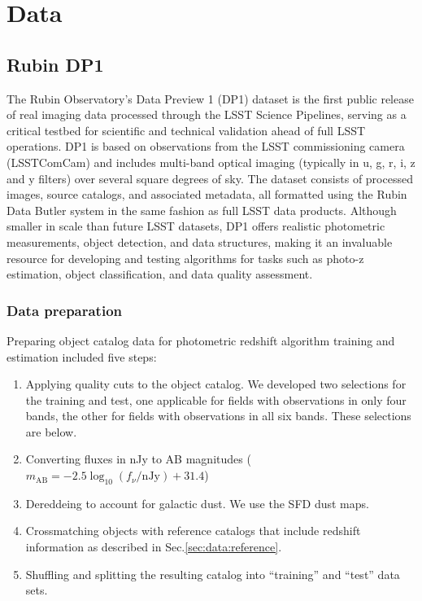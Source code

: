 \section{Data}
\label{sec:data:0}

\subsection{Rubin DP1}
\label{sec:data:dp1}

The Rubin Observatory’s Data Preview 1 (DP1) dataset is the first public release of real imaging data processed through the LSST Science Pipelines, serving as a critical testbed for scientific and technical validation ahead of full LSST operations.  DP1 is based on observations from the LSST commissioning camera (LSSTComCam) and includes multi-band optical imaging (typically in u, g, r, i, z and y filters) over several square degrees of sky.  The dataset consists of processed images, source catalogs, and associated metadata, all formatted using the Rubin Data Butler system in the same fashion as full LSST data products.  Although smaller in scale than future LSST datasets, DP1 offers realistic photometric measurements, object detection, and data structures, making it an invaluable resource for developing and testing algorithms for tasks such as photo-z estimation, object classification, and data quality assessment.

\subsubsection{Data preparation}
\label{sec:data:dp1:preparation}

Preparing object catalog data for photometric redshift algorithm training and estimation included five steps:

\begin{enumerate}
\item{Applying quality cuts to the object catalog.   We developed two selections for the training and test, one applicable for fields with observations in only four bands, the other for fields with observations in all six bands.   These selections are below.}
\item{Converting fluxes in nJy to AB magnitudes ($m_\text{AB} = -2.5 \log_{10}(f_\nu / \text{nJy}) + 31.4$)}
\item{Dereddeing to account for galactic dust.  We use the SFD dust maps\cite{SFD}.}
\item{Crossmatching objects with reference catalogs that include redshift information as described in Sec.\ref{sec:data:reference}.}
\item{Shuffling and splitting the resulting catalog into ``training'' and ``test'' data sets.}
\end{enumerate}

